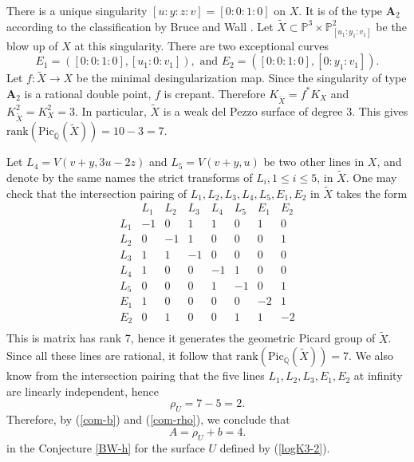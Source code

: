\documentclass[reqno, 11pt, twoside]{amsart}
\numberwithin{equation}{section}
\theoremstyle{definition}
\renewcommand{\leq}{\leqslant}
\newcommand{\Pic}{\mathrm{Pic}}
\newcommand{\PP}{\mathbb{P}}
\newcommand{\AAA}{\mathbb{A}}
\newcommand{\QQ}{\mathbb{Q}}
\begin{document}
There is a unique singularity $[u:y:z:v] = [0:0:1:0]$ on $X$. It is of the type $\mathbf{A}_2$ according to the classification by Bruce and Wall \cite[Lemma 3]{BW}.
Let $\tilde{X} \subset \PP_{}^3 \times \PP_{[u_1:y_1:v_1]}^2$ be the blow up of $X$ at this singularity.
There are two exceptional curves
$$E_1 = ([0:0:1:0],[u_1:0:v_1]), \text{ and } E_2 = ([0:0:1:0],[0:y_1:v_1]).$$
Let $f: \tilde{X} \rightarrow X$ be the minimal desingularization map. Since the singularity of type $\mathbf{A}_2$ is a rational double point, $f$ is crepant. Therefore $K_{\tilde{X}} = f^* K_X$ and $K_{\tilde{X}}^2 = K_X^2 = 3$. In particular, $\tilde{X}$ is a weak del Pezzo surface of degree $3$. This gives
$\mathrm{rank} (\Pic_{\overline{\QQ}} (\tilde{X}) ) = 10 - 3 = 7.$

Let $L_4 = V(v+y, 3u-2z)$ and $L_5 = V(v+y, u)$ be two other lines in $X$, and denote by the same names the strict transforms of $L_i, 1 \leq i \leq 5$, in $\tilde{X}$. One may check that the intersection pairing of $L_1, L_2, L_3, L_4, L_5, E_1, E_2$ in $\tilde{X}$ takes the form
$$
\begin{array}{c|ccccccc}
 & L_1 & L_2 & L_3 & L_4 & L_5 & E_1 & E_2 \\
\hline
L_1 & -1 & 0 & 1 & 1 & 0 & 1 & 0 \\
L_2 & 0 & -1 & 1 & 0 & 0 & 0 & 1 \\
L_3 & 1 & 1 & -1 & 0 & 0 & 0 & 0 \\
L_4 & 1 & 0 & 0 & -1 & 1 & 0 & 0 \\
L_5 & 0 & 0 & 0 & 1 & -1 & 0 & 1 \\
E_1 & 1 & 0 & 0 & 0 & 0 & -2 & 1 \\
E_2 & 0 & 1 & 0 & 0 & 1 & 1 & -2 \\
\end{array}
$$
This is matrix has rank 7, hence it generates the geometric Picard group of $\tilde{X}$. Since all these lines are rational, it follow that $\mathrm{rank} (\Pic_{\QQ} (\tilde{X}) ) = 7.$ We also know from the intersection pairing that the five lines $L_1,L_2,L_3,E_1,E_2$ at infinity are linearly independent, hence
\begin{equation}\label{com-rho}
	\rho_U = 7 - 5 = 2.
\end{equation}
Therefore, by (\ref{com-b}) and (\ref{com-rho}), we conclude that 
\begin{equation}\label{com-A}
	A = \rho_U + b = 4.
\end{equation}
in the Conjecture \ref{BW-h} for the surface $U$ defined by (\ref{logK3-2}).
\end{document}

